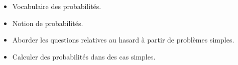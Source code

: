 \begin{prerequis}    
    \begin{itemize}        
        \item[\emoji{red-heart}] Vocabulaire des probabilités.
        \item[\emoji{red-heart}] Notion de probabilités.
        \columnbreak
        \item[\emoji{diamond-suit}] Aborder les questions relatives au hasard à partir de problèmes simples.
        \item[\emoji{diamond-suit}] Calculer des probabilités dans des cas simples.
    \end{itemize}
\end{prerequis}